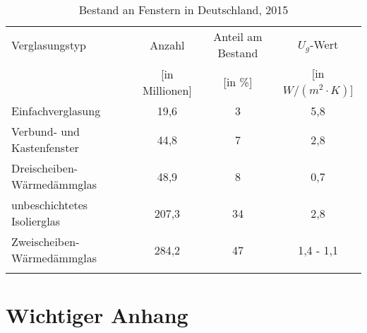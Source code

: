 \begin{table}[H]\centering
\begin{tabular}{lccc}
\toprule[1.5pt]
Verglasungstyp & Anzahl & Anteil am Bestand & \(U_g\)-Wert \\
 & [in Millionen] & [in \%] & [in \(W/(m^2 \cdot K)\)] \\ \addlinespace[5pt]
\midrule[2pt]
Einfachverglasung & 19,6 & 3 & 5,8 \\
\midrule
Verbund- und Kastenfenster & 44,8 & 7 & 2,8 \\
\midrule
Dreischeiben-Wärmedämmglas & 48,9 & 8 & 0,7 \\
\midrule
unbeschichtetes Isolierglas & 207,3 & 34 & 2,8 \\
\midrule
Zweischeiben-Wärmedämmglas & 284,2 & 47 & 1,4 - 1,1 \\
\bottomrule[1.5pt] \addlinespace[10pt]
\end{tabular}
\caption{Bestand an Fenstern in Deutschland, 2015 \cite{Bigalke.2016}}
\label{tab: TabelleA2}
\end{table}

\chapter{Wichtiger Anhang}
